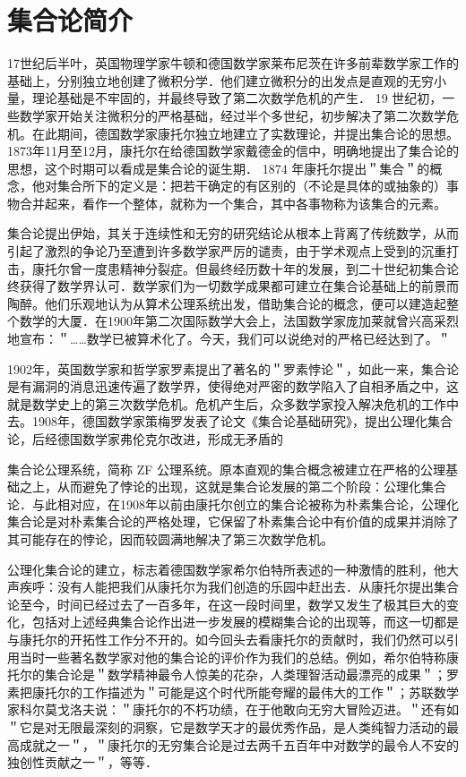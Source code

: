 \documentclass[10pt]{article}
\begin{document}
\section*{集合论简介}
17世纪后半叶，英国物理学家牛顿和德国数学家莱布尼茨在许多前辈数学家工作的基础上，分别独立地创建了微积分学．他们建立微积分的出发点是直观的无穷小量，理论基础是不牢固的，并最终导致了第二次数学危机的产生． 19 世纪初，一些数学家开始关注微积分的严格基础，经过半个多世纪，初步解决了第二次数学危机。在此期间，德国数学家康托尔独立地建立了实数理论，并提出集合论的思想。1873年11月至12月，康托尔在给德国数学家戴德金的信中，明确地提出了集合论的思想，这个时期可以看成是集合论的诞生期． 1874 年康托尔提出＂集合＂的概念，他对集合所下的定义是：把若干确定的有区别的（不论是具体的或抽象的）事物合并起来，看作一个整体，就称为一个集合，其中各事物称为该集合的元素。

集合论提出伊始，其关于连续性和无穷的研究结论从根本上背离了传统数学，从而引起了激烈的争论乃至遭到许多数学家严厉的谴责，由于学术观点上受到的沉重打击，康托尔曾一度患精神分裂症。但最终经历数十年的发展，到二十世纪初集合论终获得了数学界认可．数学家们为一切数学成果都可建立在集合论基础上的前景而陶醉。他们乐观地认为从算术公理系统出发，借助集合论的概念，便可以建造起整个数学的大厦．在1900年第二次国际数学大会上，法国数学家庞加莱就曾兴高采烈地宣布：＂……数学已被算术化了。今天，我们可以说绝对的严格已经达到了。＂

1902年，英国数学家和哲学家罗素提出了著名的＂罗素悖论＂，如此一来，集合论是有漏洞的消息迅速传遍了数学界，使得绝对严密的数学陷入了自相矛盾之中，这就是数学史上的第三次数学危机。危机产生后，众多数学家投入解决危机的工作中去。1908年，德国数学家策梅罗发表了论文《集合论基础研究》，提出公理化集合论，后经德国数学家弗伦克尔改进，形成无矛盾的

集合论公理系统，简称 ZF 公理系统。原本直观的集合概念被建立在严格的公理基础之上，从而避免了悖论的出现，这就是集合论发展的第二个阶段：公理化集合论．与此相对应，在1908年以前由康托尔创立的集合论被称为朴素集合论，公理化集合论是对朴素集合论的严格处理，它保留了朴素集合论中有价值的成果并消除了其可能存在的悖论，因而较圆满地解决了第三次数学危机。

公理化集合论的建立，标志着德国数学家希尔伯特所表述的一种激情的胜利，他大声疾呼：没有人能把我们从康托尔为我们创造的乐园中赶出去．从康托尔提出集合论至今，时间已经过去了一百多年，在这一段时间里，数学又发生了极其巨大的变化，包括对上述经典集合论作出进一步发展的模糊集合论的出现等，而这一切都是与康托尔的开拓性工作分不开的。如今回头去看康托尔的贡献时，我们仍然可以引用当时一些著名数学家对他的集合论的评价作为我们的总结。例如，希尔伯特称康托尔的集合论是＂数学精神最令人惊美的花杂，人类理智活动最漂亮的成果＂；罗素把康托尔的工作描述为＂可能是这个时代所能夸耀的最伟大的工作＂；苏联数学家科尔莫戈洛夫说：＂康托尔的不朽功绩，在于他敢向无穷大冒险迈进。＂还有如＂它是对无限最深刻的洞察，它是数学天才的最优秀作品，是人类纯智力活动的最高成就之一＂，＂康托尔的无穷集合论是过去两千五百年中对数学的最令人不安的独创性贡献之一＂，等等．
\end{document}

